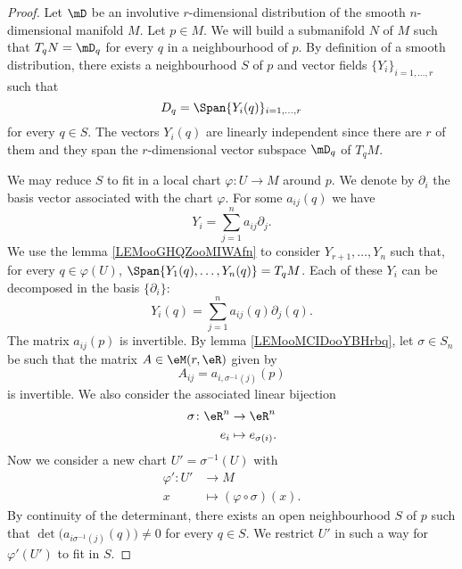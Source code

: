 \begin{proof}
    Let \( \mD\) be an involutive \( r\)-dimensional distribution of the smooth \( n\)-dimensional manifold \( M\). Let \( p\in M\). We will build a submanifold \( N\) of \( M\) such that \( T_qN=\mD_q\) for every \( q\) in a neighbourhood of \( p\). By definition of a smooth distribution, there exists a neighbourhood \( S\) of \( p\) and vector fields \( \{ Y_i \}_{i=1,\ldots, r}\) such that
    \begin{equation}
        D_q=\Span\{ Y_i(q) \}_{i=1,\ldots, r}
    \end{equation}
    for every \( q\in S\). The vectors \( Y_i(q)\) are linearly independent since there are \( r\) of them and they span the \( r\)-dimensional vector subspace \( \mD_q\) of \( T_qM\).

    We may reduce \( S\) to fit in a local chart \( \varphi\colon U\to M\) around \( p\). We denote by \( \partial_i\) the basis vector associated with the chart \( \varphi\). For some \( a_{ij}(q)\) we have
    \begin{equation}
        Y_i=\sum_{j=1}^na_{ij}\partial_j.
    \end{equation}
    We use the lemma \ref{LEMooGHQZooMIWAfn} to consider \( Y_{r+1},\ldots,  Y_n\) such that, for every \( q\in \varphi(U)\), \( \Span\{ Y_1(q),\ldots, Y_n(q) \}=T_qM\). Each of these \( Y_i\) can be decomposed in the basis \( \{ \partial_i \}\):
    \begin{equation}
        Y_i(q)=\sum_{j=1}^na_{ij}(q)\partial_j(q).
    \end{equation}
    The matrix \( a_{ij}(p)\) is invertible. By lemma \ref{LEMooMCIDooYBHrbq}, let \( \sigma\in S_n\) be such that the matrix \( A\in \eM(r,\eR)\) given by
    \begin{equation}
        A_{ij}=a_{i,\sigma^{-1}(j)}(p)
    \end{equation}
    is invertible. We also consider the associated linear bijection
    \begin{equation}
        \begin{aligned}
            \sigma\colon \eR^n&\to \eR^n \\
            e_i&\mapsto e_{\sigma(i)}. 
        \end{aligned}
    \end{equation}
    Now we consider a new chart \( U'=\sigma^{-1}(U)\) with
    \begin{equation}
        \begin{aligned}
            \varphi'\colon U'&\to M \\
            x&\mapsto (\varphi\circ \sigma)(x). 
        \end{aligned}
    \end{equation}
    By continuity of the determinant, there exists an open neighbourhood \( S\) of \( p\) such that \( \det\big( a_{i\sigma^{-1}(j)}(q) \big)\neq 0\) for every \( q\in S\). We restrict \( U'\) in such a way for \( \varphi'(U')\) to fit in \( S\).


\end{proof}
